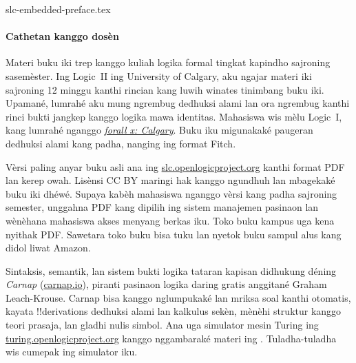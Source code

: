 \begin{filecontents*}[overwrite]{slc-embedded-preface.tex}
\paragraph{Cathetan kanggo dosèn}
Materi buku iki trep kanggo kuliah logika formal tingkat kapindho
sajroning sasemèster. Ing Logic~II ing University of Calgary, aku
ngajar materi iki sajroning 12 minggu kanthi rincian kang luwih
winates tinimbang buku iki. Upamané, lumrahé aku mung ngrembug
dedhuksi alami lan ora ngrembug kanthi rinci bukti jangkep kanggo
logika mawa identitas. Mahasiswa wis mèlu Logic~I, kang lumrahé
nganggo \emph{\href{https://forallx.openlogicproject.org}{forall x:
Calgary}}. Buku iku migunakaké paugeran dedhuksi alami kang padha,
nanging ing format Fitch.

Vèrsi paling anyar buku asli ana ing
\href{https://slc.openlogicproject.org}{slc.openlogicproject.org}
kanthi format PDF lan kerep owah. Lisènsi CC BY maringi hak kanggo
ngundhuh lan mbagekaké buku iki dhéwé. Supaya kabèh mahasiswa nganggo
vèrsi kang padha sajroning semester, unggahna PDF kang dipilih ing
sistem manajemen pasinaon lan wènèhana mahasiswa akses menyang berkas
iku. Toko buku kampus uga kena nyithak PDF. Sawetara toko buku bisa
tuku lan nyetok buku sampul alus kang didol liwat Amazon.

Sintaksis, semantik, lan sistem bukti logika tataran kapisan didhukung
déning \emph{Carnap} (\href{https://carnap.io}{carnap.io}), piranti
pasinaon logika daring gratis anggitané Graham Leach-Krouse. Carnap
bisa kanggo nglumpukaké lan mriksa soal kanthi otomatis, kayata
!!{derivation}s dedhuksi alami lan kalkulus sekèn, mènèhi struktur
kanggo teori prasaja, lan gladhi nulis simbol. Ana uga simulator mesin
Turing ing \href{https://turing.openlogicproject.org}{turing.openlogicproject.org}
kanggo nggambaraké materi ing . Tuladha-tuladha
wis cumepak ing simulator iku.
\end{filecontents*}

